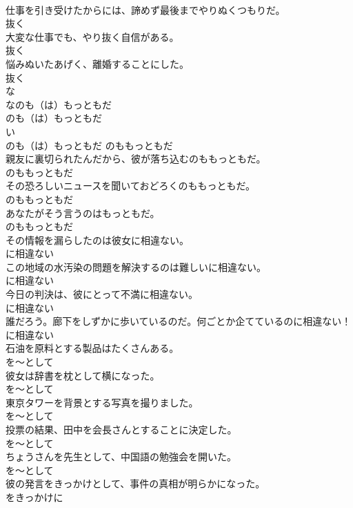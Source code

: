 \documentclass[8pt]{extreport}
\begin{document}
\begin{CJK}{UTF8}{min}
\\	仕事を引き受けたからには、諦めず最後までやりぬくつもりだ。	
\\	抜く	
\\	大変な仕事でも、やり抜く自信がある。	
\\	抜く	
\\	悩みぬいたあげく、離婚することにした。	
\\	抜く	
\\	な
\\	なのも（は）もっともだ	
\\	のも（は）もっともだ	
\\	い
\\	のも（は）もっともだ	のももっともだ	
\\	親友に裏切られたんだから、彼が落ち込むのももっともだ。	
\\	のももっともだ	
\\	その恐ろしいニュースを聞いておどろくのももっともだ。	
\\	のももっともだ	
\\	あなたがそう言うのはもっともだ。	
\\	のももっともだ	
\\	その情報を漏らしたのは彼女に相違ない。	
\\	に相違ない	
\\	この地域の水汚染の問題を解決するのは難しいに相違ない。	
\\	に相違ない	
\\	今日の判決は、彼にとって不満に相違ない。	
\\	に相違ない	
\\	誰だろう。廊下をしずかに歩いているのだ。何ごとか企てているのに相違ない！	
\\	に相違ない	
\\	石油を原料とする製品はたくさんある。	
\\	を～として	
\\	彼女は辞書を枕として横になった。	
\\	を～として	
\\	東京タワーを背景とする写真を撮りました。	
\\	を～として	
\\	投票の結果、田中を会長さんとすることに決定した。	
\\	を～として	
\\	ちょうさんを先生として、中国語の勉強会を開いた。	
\\	を～として	
\\	彼の発言をきっかけとして、事件の真相が明らかになった。	
\\	をきっかけに	

\end{CJK}
\end{document}
